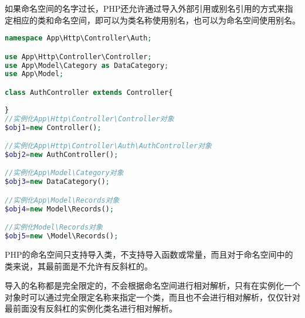 如果命名空间的名字过长，PHP还允许通过导入外部引用或别名引用的方式来指定相应的类和命名空间，即可以为类名称使用别名，也可以为命名空间使用别名。





\begin{lstlisting}[language=PHP]
namespace App\Http\Controller\Auth;

use App\Http\Controller\Controller;
use App\Model\Category as DataCategory;
use App\Model;

class AuthController extends Controller{
    
}
//实例化App\Http\Controller\Controller对象
$obj1=new Controller();

//实例化App\Http\Controller\Auth\AuthController对象
$obj2=new AuthController();

//实例化App\Model\Category对象
$obj3=new DataCategory();

//实例化App\Model\Records对象
$obj4=new Model\Records();

//实例化Model\Records对象
$obj5=new \Model\Records();
\end{lstlisting}

PHP的命名空间只支持导入类，不支持导入函数或常量，而且对于命名空间中的类来说，其最前面是不允许有反斜杠的。

导入的名称都是完全限定的，不会根据命名空间进行相对解析，只有在实例化一个对象时可以通过完全限定名称来指定一个类，而且也不会进行相对解析，仅仅针对最前面没有反斜杠的实例化类名进行相对解析。

